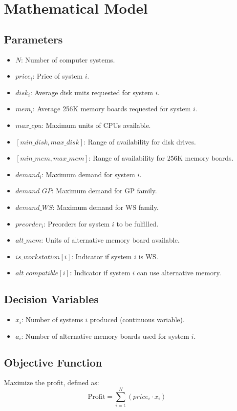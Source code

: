 \documentclass{article}
\begin{document}
\section*{Mathematical Model}

\subsection*{Parameters}
\begin{itemize}
    \item $N$: Number of computer systems.
    \item $price_i$: Price of system $i$.
    \item $disk_i$: Average disk units requested for system $i$.
    \item $mem_i$: Average 256K memory boards requested for system $i$.
    \item $max\_cpu$: Maximum units of CPUs available.
    \item $[min\_disk, max\_disk]$: Range of availability for disk drives.
    \item $[min\_mem, max\_mem]$: Range of availability for 256K memory boards.
    \item $demand_i$: Maximum demand for system $i$.
    \item $demand\_GP$: Maximum demand for GP family.
    \item $demand\_WS$: Maximum demand for WS family.
    \item $preorder_i$: Preorders for system $i$ to be fulfilled.
    \item $alt\_mem$: Units of alternative memory board available.
    \item $is\_workstation[i]$: Indicator if system $i$ is WS.
    \item $alt\_compatible[i]$: Indicator if system $i$ can use alternative memory.
\end{itemize}

\subsection*{Decision Variables}
\begin{itemize}
    \item $x_i$: Number of systems $i$ produced (continuous variable).
    \item $a_i$: Number of alternative memory boards used for system $i$.
\end{itemize}

\subsection*{Objective Function}
Maximize the profit, defined as:
\[
\text{Profit} = \sum_{i=1}^{N} (price_i \cdot x_i)
\]
\end{document}
